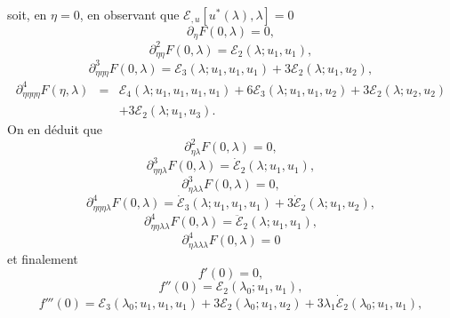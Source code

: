 \documentclass{article}
\begin{document}
soit, en $\eta = 0$, en observant que $\mathcal{E}_{, u} [u^{\ast} (λ),
λ] = 0$
\begin{equation} \partial_{\eta} F (0, λ) = 0, \end{equation}
\begin{equation} \partial_{\eta  \eta}^2 F (0, λ) =\mathcal{E}_2 (λ ;
   u_1, u_1), \end{equation}
\begin{equation} \partial_{\eta  \eta  \eta}^3 F (0, λ) =\mathcal{E}_3
   (λ ; u_1, u_1, u_1) + 3\mathcal{E}_2 (λ ; u_1, u_2), \end{equation}
\begin{eqnarray}
  \partial_{\eta  \eta  \eta  \eta}^4 F (\eta,
  λ) & = & \mathcal{E}_4 (λ ; u_1, u_1, u_1, u_1) + 6\mathcal{E}_3
  (λ ; u_1, u_1, u_2) + 3\mathcal{E}_2 (λ ; u_2, u_2) \nonumber\\
  &  &  + 3\mathcal{E}_2 (λ ; u_1, u_3) . \nonumber
\end{eqnarray}
On en déduit que
\begin{equation} \partial_{\eta  λ}^2 F (0, λ) = 0, \end{equation}
\begin{equation} \partial_{\eta  \eta  λ}^3 F (0, λ) =
   \dot{\mathcal{E}}_2 (λ ; u_1, u_1), \end{equation}
\begin{equation} \partial_{\eta  λ  λ}^3 F (0, λ) = 0, \end{equation}
\begin{equation} \partial_{\eta  \eta  \eta  λ}^4 F (0,
   λ) = \dot{\mathcal{E}}_3 (λ ; u_1, u_1, u_1) + 3
   \dot{\mathcal{E}}_2 (λ ; u_1, u_2), \text{} \text{} \end{equation}
\begin{equation} \partial_{\eta  \eta  λ  λ}^4 F (0,
   λ) = \ddot{\mathcal{E}}_2 (λ ; u_1, u_1), \end{equation}
\begin{equation} \partial_{\eta  λ  λ  λ}^4 F (0,
   λ) = 0 \end{equation}
et finalement
\begin{equation} f' (0) = 0, \end{equation}
\begin{equation} f'' (0) =\mathcal{E}_2 (λ_0 ; u_1, u_1), \end{equation}
\begin{equation} f''' (0) =\mathcal{E}_3 (λ_0 ; u_1, u_1, u_1) + 3\mathcal{E}_2
   (λ_0 ; u_1, u_2) + 3 λ_1  \dot{\mathcal{E}}_2 (λ_0 ; u_1,
   u_1), \end{equation}
\end{document}
